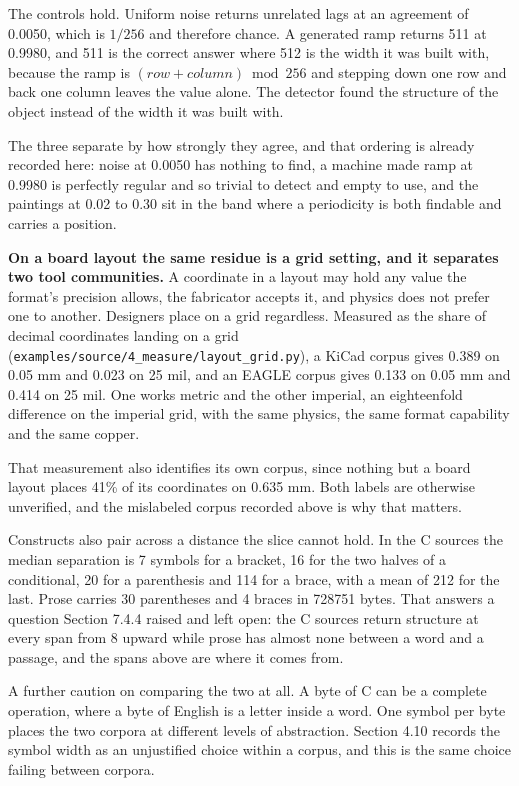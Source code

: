 The controls hold. Uniform noise returns unrelated lags at an agreement of 0.0050, which is \(1/256\) and therefore chance. A generated ramp returns 511 at 0.9980, and 511 is the correct answer where 512 is the width it was built with, because the ramp is \((row + column) \bmod 256\) and stepping down one row and back one column leaves the value alone. The detector found the structure of the object instead of the width it was built with.

The three separate by how strongly they agree, and that ordering is already recorded here: noise at 0.0050 has nothing to find, a machine made ramp at 0.9980 is perfectly regular and so trivial to detect and empty to use, and the paintings at 0.02 to 0.30 sit in the band where a periodicity is both findable and carries a position.

\textbf{On a board layout the same residue is a grid setting, and it separates two tool communities.} A coordinate in a layout may hold any value the format's precision allows, the fabricator accepts it, and physics does not prefer one to another. Designers place on a grid regardless. Measured as the share of decimal coordinates landing on a grid (\texttt{examples/\allowbreak{}source/\allowbreak{}4\_\allowbreak{}measure/\allowbreak{}layout\_\allowbreak{}grid.\allowbreak{}py}), a KiCad corpus gives 0.389 on 0.05 mm and 0.023 on 25 mil, and an EAGLE corpus gives 0.133 on 0.05 mm and 0.414 on 25 mil. One works metric and the other imperial, an eighteenfold difference on the imperial grid, with the same physics, the same format capability and the same copper.

That measurement also identifies its own corpus, since nothing but a board layout places 41\% of its coordinates on 0.635 mm. Both labels are otherwise unverified, and the mislabeled corpus recorded above is why that matters.

Constructs also pair across a distance the slice cannot hold. In the C sources the median separation is 7 symbols for a bracket, 16 for the two halves of a conditional, 20 for a parenthesis and 114 for a brace, with a mean of 212 for the last. Prose carries 30 parentheses and 4 braces in 728751 bytes. That answers a question Section 7.4.4 raised and left open: the C sources return structure at every span from 8 upward while prose has almost none between a word and a passage, and the spans above are where it comes from.

A further caution on comparing the two at all. A byte of C can be a complete operation, where a byte of English is a letter inside a word. One symbol per byte places the two corpora at different levels of abstraction. Section 4.10 records the symbol width as an unjustified choice within a corpus, and this is the same choice failing between corpora.

